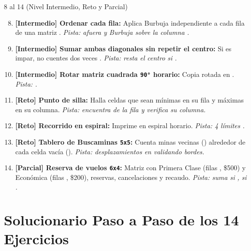 \documentclass[11pt,letterpaper]{article}
\begin{document}
\begin{ejercicio}{8 al 14 (Nivel Intermedio, Reto y Parcial)}
\begin{enumerate}
  \setcounter{enumi}{7}
  \item \textbf{[Intermedio] Ordenar cada fila:} Aplica Burbuja independiente a cada fila de una matriz . \emph{Pista:  afuera y Burbuja sobre la columna .}
  \item \textbf{[Intermedio] Sumar ambas diagonales sin repetir el centro:} Si  es impar, no cuentes dos veces . \emph{Pista: resta el centro si .}
  \item \textbf{[Intermedio] Rotar matriz cuadrada \texttt{90°} horario:} Copia  rotada en . \emph{Pista: .}
  \item \textbf{[Reto] Punto de silla:} Halla celdas que sean mínimas en su fila y máximas en su columna. \emph{Pista: encuentra  de la fila  y verifica su columna.}
  \item \textbf{[Reto] Recorrido en espiral:} Imprime  en espiral horario. \emph{Pista: 4 límites .}
  \item \textbf{[Reto] Tablero de Buscaminas \texttt{5x5}:} Cuenta minas vecinas () alrededor de cada celda vacía (). \emph{Pista: desplazamientos  en  validando bordes.}
  \item \textbf{[Parcial] Reserva de vuelos \texttt{6x4}:} Matriz  con Primera Clase (filas , \$500) y Económica (filas , \$200), reservas, cancelaciones y recaudo. \emph{Pista: suma  si ,  si .}
\end{enumerate}
\end{ejercicio}

\section{Solucionario Paso a Paso de los 14 Ejercicios}
\end{document}
